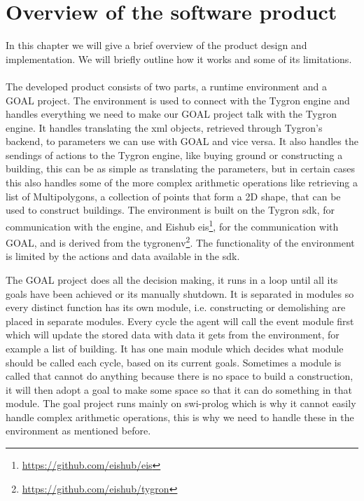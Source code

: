 \chapter{Overview of the software product}\label{ch:overview}
In this chapter we will give a brief overview of the product design and implementation. We will briefly outline how it works and some of its limitations.
\\
\\
The developed product consists of two parts, a runtime environment and a GOAL project.
The environment is used to connect with the Tygron engine and handles everything we need to make our GOAL project talk with the Tygron engine.
It handles translating the xml objects, retrieved through Tygron's backend, to parameters we can use with GOAL and vice versa.
It also handles the sendings of actions to the Tygron engine, like buying ground or constructing a building, this can be as simple as translating the parameters, but in certain cases this also handles some of the more complex arithmetic operations like retrieving a list of Multipolygons, a collection of points that form a 2D shape, that can be used to construct buildings.
The environment is built on the Tygron sdk, for communication with the engine, and Eishub eis\footnote{\url{https://github.com/eishub/eis}}, for the communication with GOAL, and is derived from the tygronenv\footnote{\url{https://github.com/eishub/tygron}}.
The functionality of the environment is limited by the actions and data available in the sdk.

The GOAL project does all the decision making, it runs in a loop until all its goals have been achieved or its manually shutdown.
It is separated in modules so every distinct function has its own module, i.e. constructing or demolishing are placed in separate modules.
Every cycle the agent will call the event module first which will update the stored data with data it gets from the environment, for example a list of building.
It has one main module which decides what module should be called each cycle, based on its current goals.
Sometimes a module is called that cannot do anything because there is no space to build a construction, it will then adopt a goal to make some space so that it can do something in that module.
The goal project runs mainly on swi-prolog which is why it cannot easily handle complex arithmetic operations, this is why we need to handle these in the environment as mentioned before.
